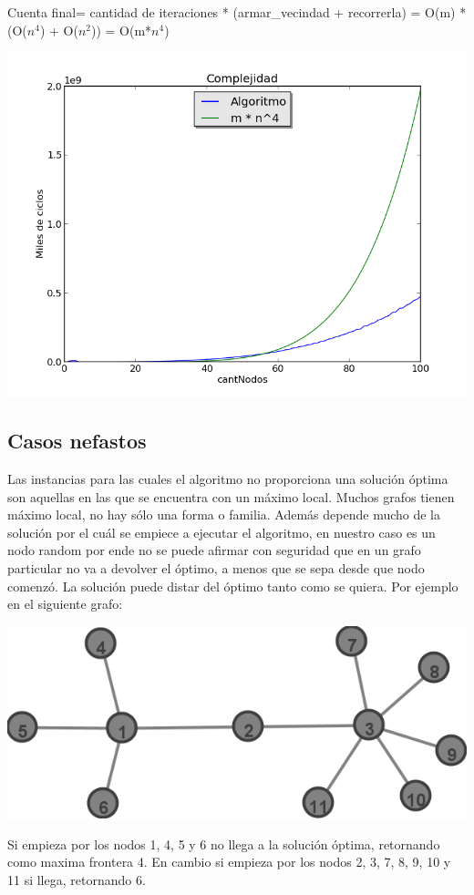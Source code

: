 Cuenta final= cantidad de iteraciones * (armar\_vecindad + recorrerla) = O(m) * (O($n^4$) + O($n^2$)) = O(m*$n^4$)
\begin{center}
\includegraphics[scale=0.8]{Images/complejidad.png} 
\end{center}

\subsection{Casos nefastos}
Las instancias para las cuales el algoritmo no proporciona una solución óptima son aquellas en las que se encuentra con un máximo local. Muchos grafos tienen máximo local, no hay sólo una forma o familia. Además depende mucho de la solución por el cuál se empiece a ejecutar el algoritmo, en nuestro caso es un nodo random por ende no se puede afirmar con seguridad que en un grafo particular no va a devolver el óptimo, a menos que se sepa desde que nodo comenzó.
La solución puede distar del óptimo tanto como se quiera.
Por ejemplo en el siguiente grafo:

\begin{center}
\includegraphics[scale=0.5]{Images/ejemploCasoMaloLocal.png} 
\end{center}

Si empieza por los nodos 1, 4, 5 y 6 no llega a la solución óptima, retornando como maxima frontera 4.
En cambio si empieza por los nodos 2, 3, 7, 8, 9, 10 y 11 si llega, retornando 6.






